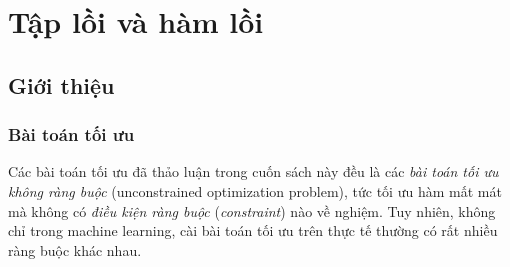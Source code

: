
\chapter{Tập lồi và hàm lồi}
\label{cha:convexity}
\section{Giới thiệu}
\subsection{Bài toán tối ưu}
Các bài toán tối ưu đã thảo luận trong cuốn sách này đều là các \textit{bài toán
tối ưu không ràng buộc} ({unconstrained optimization problem}), tức tối
ưu hàm mất mát mà không có \textit{điều kiện ràng buộc} (\textit{constraint})
nào về nghiệm. Tuy nhiên, không chỉ trong machine learning, cài bài 
toán tối ưu trên thực tế thường có rất nhiều ràng buộc khác nhau. 


 
 
